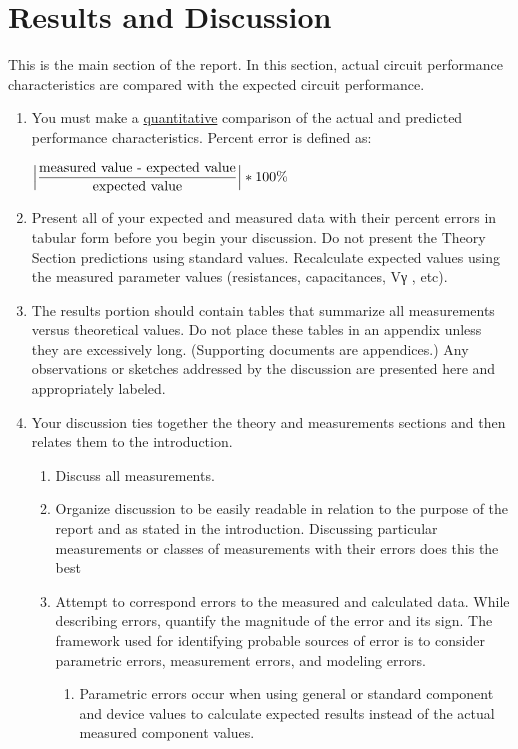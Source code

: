 \section{Results and Discussion}
This is the main section of the report.  In this section, actual circuit performance characteristics are compared with the expected circuit performance.
\begin{enumerate}
	\item You must make a \underline{quantitative} comparison of the actual and predicted performance characteristics.  Percent error is defined as:
	
		\qquad $ \Bigl|\dfrac{\text{measured value - expected value}}{\text{expected 	value}}\Bigr|*100\% $
	
	\item Present all of your expected and measured data with their percent errors in tabular form before you begin your discussion.  Do not present the Theory Section predictions using standard values.  Recalculate expected values using the measured parameter values (resistances, capacitances, Vγ , etc).
	\item The results portion should contain tables that summarize all measurements versus theoretical values.  Do not place these tables in an appendix unless they are excessively long.  (Supporting documents are appendices.)  Any observations or sketches addressed by the discussion are presented here and appropriately labeled.
	\item Your discussion ties together the theory and measurements sections and then relates them to the introduction.
	\begin{enumerate}
		\item Discuss all measurements.
		\item Organize discussion to be easily readable in relation to the purpose of the report and as stated in the introduction.  Discussing particular measurements or classes of measurements with their errors does this the best
		\item Attempt to correspond errors to the measured and calculated data.  While describing errors, quantify the magnitude of the error and its sign.  The framework used for identifying probable sources of error is to consider parametric errors, measurement errors, and modeling errors.
		\begin{enumerate}
			\item Parametric errors occur when using general or standard component and device values to calculate expected results instead of the actual measured component values. 

\end{enumerate}
\end{enumerate}
\end{enumerate}
